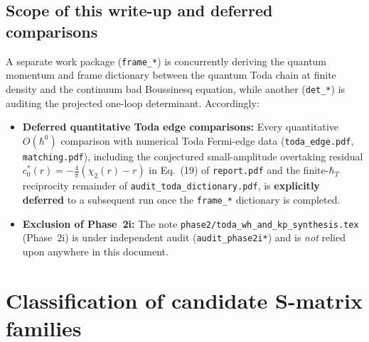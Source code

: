 \documentclass[11pt,a4paper]{article}
\theoremstyle{remark}
\begin{document}
\subsection{Scope of this write-up and deferred comparisons}
A separate work package (\texttt{frame\_*}) is concurrently deriving the quantum momentum and frame dictionary between the quantum Toda chain at finite density and the continuum bad Boussinesq equation, while another (\texttt{det\_*}) is auditing the projected one-loop determinant. Accordingly:
\begin{itemize}
\item \textbf{Deferred quantitative Toda edge comparisons:} Every quantitative $O(\hbar^0)$ comparison with numerical Toda Fermi-edge data (\texttt{toda\_edge.pdf}, \texttt{matching.pdf}), including the conjectured small-amplitude overtaking residual $c_0^*(r)=-\frac4\pi(\chi_2(r)-r)$ in Eq.~(19) of \texttt{report.pdf} and the finite-$\hbar_T$ reciprocity remainder of \texttt{audit\_toda\_dictionary.pdf}, is \textbf{explicitly deferred} to a subsequent run once the \texttt{frame\_*} dictionary is completed.
\item \textbf{Exclusion of Phase~2i:} The note \texttt{phase2/toda\_wh\_and\_kp\_synthesis.tex} (Phase~2i) is under independent audit (\texttt{audit\_phase2i*}) and is \emph{not} relied upon anywhere in this document.
\end{itemize}

\section{Classification of candidate S-matrix families}\label{sec:families}
\end{document}
